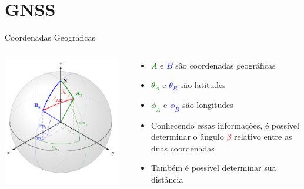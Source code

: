 \section{GNSS}
    \begin{frame}{Coordenadas Geográficas}
        \begin{columns}
            \begin{column}{0.55\textwidth}
                \centering
                \includegraphics[width=0.95\textwidth]{../pictures/globo.pdf}
            \end{column}
            \begin{column}{0.45\textwidth}
                \begin{itemize}[<+->]
                    \item \textcolor{Green}{$A$} e \textcolor{Blue}{$B$} são coordenadas geográficas
                    \item \textcolor{Green}{$\theta_A$} e \textcolor{Blue}{$\theta_B$} são latitudes
                    \item \textcolor{Green}{$\phi_A$} e \textcolor{Blue}{$\phi_B$} são longitudes
                    \item Conhecendo essas informações, é possível determinar o ângulo \textcolor{Red}{$\beta$} relativo entre as duas coordenadas
                    \item Também é possível determinar sua distância
                \end{itemize}
            \end{column}
        \end{columns}
    \end{frame}

